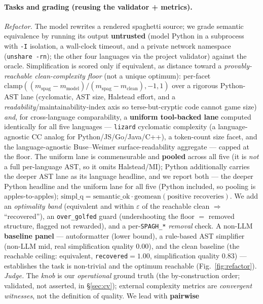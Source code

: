 \documentclass[11pt]{article}
\begin{document}
\paragraph{Tasks and grading (reusing the validator + metrics).}
\emph{Refactor.} The model rewrites a rendered spaghetti source; we grade semantic
equivalence by running its output \textbf{untrusted} (model Python in a subprocess
with \texttt{-I} isolation, a wall-clock timeout, and a private network namespace (\texttt{unshare -rn}); the other four
languages via the project validator) against the oracle. Simplification is scored only
if equivalent, as distance toward a \emph{provably-reachable clean-complexity floor}
(not a unique optimum): per-facet
$\mathrm{clamp}((m_{\text{spag}}\!-\!m_{\text{model}})/(m_{\text{spag}}\!-\!
m_{\text{clean}}),-1,1)$ over a rigorous Python-AST lane (cyclomatic, AST size,
Halstead effort, and a \emph{readability}/maintainability-index axis so
terse-but-cryptic code cannot game size) \emph{and}, for cross-language comparability, a
\textbf{uniform tool-backed lane} computed identically for all five languages ---
\texttt{lizard} cyclomatic complexity (a language-agnostic CC analog for
Python/JS/Go/Java/C++), a token-count size facet, and the language-agnostic Buse--Weimer
surface-readability aggregate --- capped at the floor. The uniform lane is commensurable
and \textbf{pooled} across all five (it is \emph{not} a full per-language AST, so it omits
Halstead/MI); Python additionally carries the deeper AST lane as its language headline, and
we report both --- the deeper Python headline and the uniform lane for all five (Python
included, so pooling is apples-to-apples);
$\text{simpl\_q}=\text{semantic\_ok}\cdot
\mathrm{geomean}(\text{positive recoveries})$. We add an \emph{optimality band}
(equivalent and within $\varepsilon$ of the reachable clean $\Rightarrow$
``recovered''), an \texttt{over\_golfed} guard (undershooting the floor $=$ removed
structure, flagged not rewarded), and a per-\texttt{SPAGH\_*} \emph{removal} check.
A non-LLM \textbf{baseline panel} --- autoformatter (lower bound), a rule-based AST
simplifier (non-LLM mid, real simplification quality $0.00$), and the clean baseline (the
reachable ceiling: equivalent, \texttt{recovered}$=1.00$, simplification quality $0.83$)
--- establishes the task is non-trivial and the optimum reachable
(Fig.~\ref{fig:refactor}).
\emph{Judge.} The \emph{knob} is our \emph{operational} ground truth (the by-construction
order; validated, not asserted, in \S\ref{sec:cv}); external complexity metrics are
\emph{convergent witnesses}, not the definition of quality. We lead with \textbf{pairwise}
\end{document}
